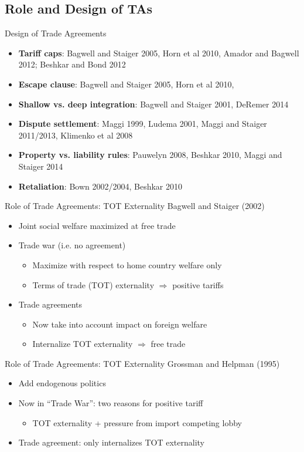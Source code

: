 \documentclass[handout]{beamer}
\begin{document}
\subsection{Role and Design of TAs}
\begin{frame}{Design of Trade Agreements}
\pause
\begin{itemize}[<+->]
	\item \textbf{Tariff caps}: Bagwell and Staiger 2005, Horn et al 2010, Amador and Bagwell 2012; Beshkar and Bond 2012
	\item \textbf{Escape clause}: Bagwell and Staiger 2005, Horn et al 2010, 
	\item \textbf{Shallow vs. deep integration}: Bagwell and Staiger 2001, DeRemer 2014
	\item \textbf{Dispute settlement}: Maggi 1999, Ludema 2001, Maggi and Staiger 2011/2013, Klimenko et al 2008
	\item \textbf{Property vs. liability rules}: Pauwelyn 2008, Beshkar 2010, Maggi and Staiger 2014
	\item \textbf{Retaliation}: Bown 2002/2004, Beshkar 2010
\end{itemize}
\end{frame} 


\begin{frame}{Role of Trade Agreements: TOT Externality}
\pause
Bagwell and Staiger (2002)
\pause
\begin{itemize}[<+->]
	\item Joint social welfare maximized at free trade
	\item Trade war (i.e. no agreement)
		\begin{itemize}
			\item Maximize with respect to home country welfare only
			\item Terms of trade (TOT) externality $\Rightarrow$ positive tariffs  
		\end{itemize}
	\item Trade agreements
    \begin{itemize}
			\item Now take into account impact on foreign welfare
			\item Internalize TOT externality $\Rightarrow$ free trade
    \end{itemize}
\end{itemize}
\end{frame} 

 
\begin{frame}{Role of Trade Agreements: TOT Externality}
\pause
Grossman and Helpman (1995)
\pause
\begin{itemize}[<+->]
	\item Add endogenous politics
	\item Now in ``Trade War'': two reasons for positive tariff
		\begin{itemize}
			\item TOT externality + pressure from import competing lobby
		\end{itemize}
	
	\item Trade agreement: only internalizes TOT externality
\end{itemize}
\end{frame} 
\end{document}
